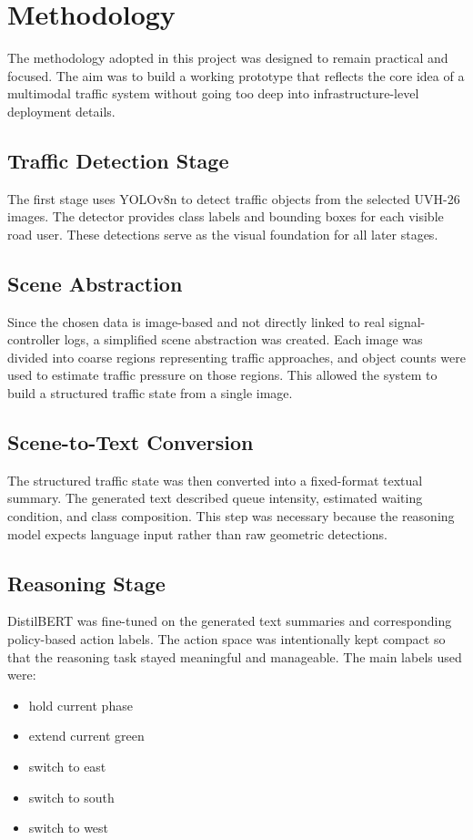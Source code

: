 \documentclass[12pt,a4paper]{report}
\begin{document}
\chapter{Methodology}
The methodology adopted in this project was designed to remain practical and focused. The aim was to build a working prototype that reflects the core idea of a multimodal traffic system without going too deep into infrastructure-level deployment details.

\section*{Traffic Detection Stage}
The first stage uses YOLOv8n to detect traffic objects from the selected UVH-26 images. The detector provides class labels and bounding boxes for each visible road user. These detections serve as the visual foundation for all later stages.

\section*{Scene Abstraction}
Since the chosen data is image-based and not directly linked to real signal-controller logs, a simplified scene abstraction was created. Each image was divided into coarse regions representing traffic approaches, and object counts were used to estimate traffic pressure on those regions. This allowed the system to build a structured traffic state from a single image.

\section*{Scene-to-Text Conversion}
The structured traffic state was then converted into a fixed-format textual summary. The generated text described queue intensity, estimated waiting condition, and class composition. This step was necessary because the reasoning model expects language input rather than raw geometric detections.

\section*{Reasoning Stage}
DistilBERT was fine-tuned on the generated text summaries and corresponding policy-based action labels. The action space was intentionally kept compact so that the reasoning task stayed meaningful and manageable. The main labels used were:
\begin{itemize}[leftmargin=1.5cm]
\item hold current phase
\item extend current green
\item switch to east
\item switch to south
\item switch to west
\end{itemize}
\end{document}
